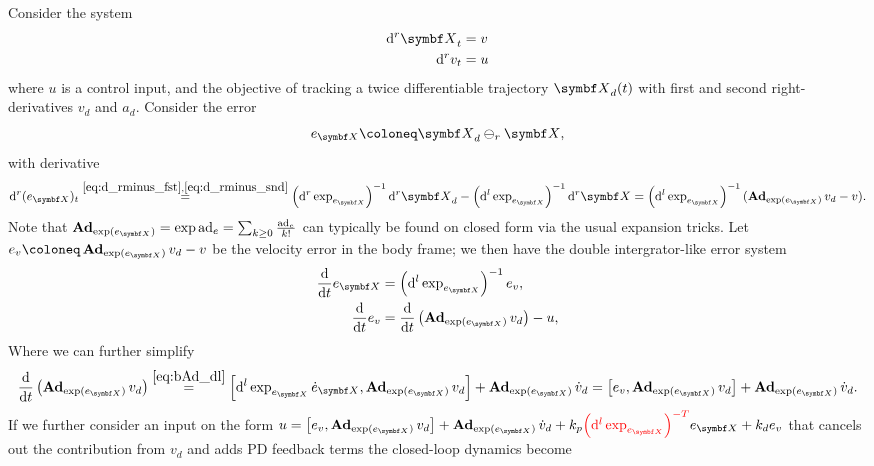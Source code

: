 Consider the system
\begin{equation}
  \begin{aligned}
    \mathrm{d}^r \X_t & = v \\
    \mathrm{d}^r v_t  & = u
  \end{aligned}
\end{equation}
where $u$ is a control input, and the objective of tracking a twice differentiable trajectory $\X_d(t)$ with first and second right-derivatives $v_d$ and $a_d$. Consider the error
\begin{equation}
  e_\X \coloneq \X_d \ominus_r \X,
\end{equation}
with derivative
\begin{equation}
  \mathrm{d}^r (e_\X)_t \overset{\eqref{eq:d_rminus_fst},\eqref{eq:d_rminus_snd}}= \left(\mathrm{d}^r \exp_{e_\X} \right)^{-1} \mathrm{d}^r \X_d - \left(\mathrm{d}^l \exp_{e_\X} \right)^{-1} \mathrm{d}^r \X = \left(\mathrm{d}^l \exp_{e_\X} \right)^{-1} (\bAd_{\exp(e_\X)} v_d - v).
\end{equation}
Note that $\bAd_{\exp(e_\X)} = \exp \ad_{e} = \sum_{k \geq 0} \frac{\ad_e}{k!}$ can typically be found on closed form via the usual expansion tricks. Let $e_v \coloneq \bAd_{\exp(e_\X)} v_d - v$ be the velocity error in the body frame; we then have the double intergrator-like error system
\begin{equation}
  \begin{aligned}
    \frac{\mathrm{d}}{\mathrm{d}t} e_\X & = \left(\mathrm{d}^l \exp_{e_\X} \right)^{-1} e_v,                        \\
    \frac{\mathrm{d}}{\mathrm{d}t} e_v  & = \frac{\mathrm{d}}{\mathrm{d}t} \left( \bAd_{\exp(e_\X)} v_d\right) - u,
  \end{aligned}
\end{equation}
Where we can further simplify
\begin{equation}
  \frac{\mathrm{d}}{\mathrm{d}t} \left( \bAd_{\exp(e_\X)} v_d\right) \overset{\eqref{eq:bAd_dl}}= \left[ \mathrm{d}^l \exp_{e_\X} \dot e_\X,  \bAd_{\exp(e_\X)} v_d \right] + \bAd_{\exp(e_\X)} \dot v_d = \left[ e_v,  \bAd_{\exp(e_\X)} v_d \right] + \bAd_{\exp(e_\X)} \dot v_d.
\end{equation}
If we further consider an input on the form $u = \left[ e_v,  \bAd_{\exp(e_\X)} v_d \right] + \bAd_{\exp(e_\X)} \dot v_d + k_p \textcolor{red}{\left( \mathrm{d}^l \exp_{e_\X} \right)^{-T}} e_\X + k_d e_v$ that cancels out the contribution from $v_d$ and adds PD feedback terms the closed-loop dynamics become
